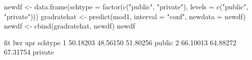 \begin{Schunk}
\begin{Sinput}
 newdf <- data.frame(schtype = factor(c("public", "private"), levels = c("public", "private")))
 gradratehat <- predict(mod1, interval = "conf", newdata = newdf)
 newdf <- cbind(gradratehat, newdf)
 newdf
\end{Sinput}
\begin{Soutput}
       fit      lwr      upr schtype
1 50.18203 48.56150 51.80256  public
2 66.10013 64.88272 67.31754 private
\end{Soutput}
\end{Schunk}
